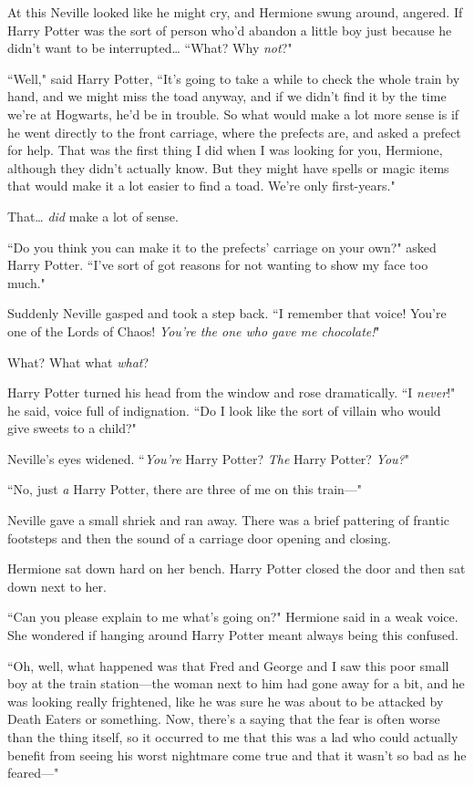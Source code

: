 At this Neville looked like he might cry, and Hermione swung around, angered. If Harry Potter was the sort of person who'd abandon a little boy just because he didn't want to be interrupted{\ldots} ``What? Why \emph{not}?"

``Well," said Harry Potter, ``It's going to take a while to check the whole train by hand, and we might miss the toad anyway, and if we didn't find it by the time we're at Hogwarts, he'd be in trouble. So what would make a lot more sense is if he went directly to the front carriage, where the prefects are, and asked a prefect for help. That was the first thing I did when I was looking for you, Hermione, although they didn't actually know. But they might have spells or magic items that would make it a lot easier to find a toad. We're only first-years."

That{\ldots} \emph{did} make a lot of sense.

``Do you think you can make it to the prefects' carriage on your own?" asked Harry Potter. ``I've sort of got reasons for not wanting to show my face too much."

Suddenly Neville gasped and took a step back. ``I remember that voice! You're one of the Lords of Chaos! \emph{You're the one who gave me chocolate!}"

What? What what \emph{what}?

Harry Potter turned his head from the window and rose dramatically. ``I \emph{never}!" he said, voice full of indignation. ``Do I look like the sort of villain who would give sweets to a child?"

Neville's eyes widened. ``\emph{You're} Harry Potter? \emph{The} Harry Potter? \emph{You?}"

``No, just \emph{a} Harry Potter, there are three of me on this train—"

Neville gave a small shriek and ran away. There was a brief pattering of frantic footsteps and then the sound of a carriage door opening and closing.

Hermione sat down hard on her bench. Harry Potter closed the door and then sat down next to her.

``Can you please explain to me what's going on?" Hermione said in a weak voice. She wondered if hanging around Harry Potter meant always being this confused.

``Oh, well, what happened was that Fred and George and I saw this poor small boy at the train station—the woman next to him had gone away for a bit, and he was looking really frightened, like he was sure he was about to be attacked by Death Eaters or something. Now, there's a saying that the fear is often worse than the thing itself, so it occurred to me that this was a lad who could actually benefit from seeing his worst nightmare come true and that it wasn't so bad as he feared—"

